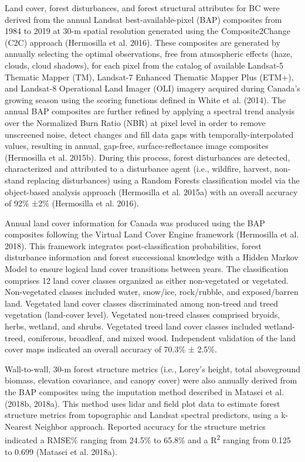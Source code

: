 \documentclass[11pt]{article}
\begin{document}
Land cover, forest disturbances, and forest structural attributes for BC
were derived from the annual Landsat best-available-pixel (BAP)
composites from 1984 to 2019 at 30-m spatial resolution generated using
the Composite2Change (C2C) approach (Hermosilla et al. 2016). These
composites are generated by annually selecting the optimal observations,
free from atmospheric effects (haze, clouds, cloud shadows), for each
pixel from the catalog of available Landsat-5 Thematic Mapper (TM),
Landsat-7 Enhanced Thematic Mapper Plus (ETM+), and Landsat-8
Operational Land Imager (OLI) imagery acquired during Canada's growing
season using the scoring functions defined in White et al. (2014). The
annual BAP composites are further refined by applying a spectral trend
analysis over the Normalized Burn Ratio (NBR) at pixel level in order to
remove unscreened noise, detect changes and fill data gaps with
temporally-interpolated values, resulting in annual, gap-free,
surface-reflectance image composites (Hermosilla et al. 2015b). During
this process, forest disturbances are detected, characterized and
attributed to a disturbance agent (i.e., wildfire, harvest, non-stand
replacing disturbances) using a Random Forests classification model via
the object-based analysis approach (Hermosilla et al. 2015a) with an
overall accuracy of 92\% ±2\% (Hermosilla et al. 2016).

Annual land cover information for Canada was produced using the BAP
composites following the Virtual Land Cover Engine framework (Hermosilla
et al. 2018). This framework integrates post-classification
probabilities, forest disturbance information and forest successional
knowledge with a Hidden Markov Model to ensure logical land cover
transitions between years. The classification comprises 12 land cover
classes organized as either non-vegetated or vegetated. Non-vegetated
classes included water, snow/ice, rock/rubble, and exposed/barren land.
Vegetated land cover classes discriminated among non-treed and treed
vegetation (land-cover level). Vegetated non-treed classes comprised
bryoids, herbs, wetland, and shrubs. Vegetated treed land cover classes
included wetland-treed, coniferous, broadleaf, and mixed wood.
Independent validation of the land cover maps indicated an overall
accuracy of 70.3\% ± 2.5\%.

Wall-to-wall, 30-m forest structure metrics (i.e., Lorey's height, total
aboveground biomass, elevation covariance, and canopy cover) were also
annually derived from the BAP composites using the imputation method
described in Matasci et al. (2018b, 2018a). This method uses lidar and
field plot data to estimate forest structure metrics from topographic
and Landsat spectral predictors, using a k-Nearest Neighbor approach.
Reported accuracy for the structure metrics indicated a RMSE\% ranging
from 24.5\% to 65.8\% and a R\textsuperscript{2} ranging from 0.125 to
0.699 (Matasci et al. 2018a).
\end{document}
